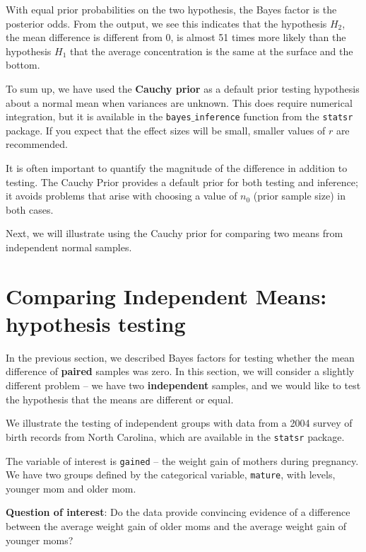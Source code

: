 \documentclass[]{book}
\theoremstyle{definition}
\theoremstyle{definition}
\theoremstyle{definition}
\theoremstyle{remark}
\let\BeginKnitrBlock\begin \let\EndKnitrBlock\end
\begin{document}
With equal prior probabilities on the two hypothesis, the Bayes factor
is the posterior odds. From the output, we see this indicates that the
hypothesis \(H_2\), the mean difference is different from 0, is almost
51 times more likely than the hypothesis \(H_1\) that the average
concentration is the same at the surface and the bottom.

To sum up, we have used the \textbf{Cauchy prior} as a default prior
testing hypothesis about a normal mean when variances are unknown. This
does require numerical integration, but it is available in the
\texttt{bayes$\_$inference} function from the \texttt{statsr} package.
If you expect that the effect sizes will be small, smaller values of
\(r\) are recommended.

It is often important to quantify the magnitude of the difference in
addition to testing. The Cauchy Prior provides a default prior for both
testing and inference; it avoids problems that arise with choosing a
value of \(n_0\) (prior sample size) in both cases.

Next, we will illustrate using the Cauchy prior for comparing two means
from independent normal samples.

\section{Comparing Independent Means: hypothesis
testing}\label{comparing-independent-means-hypothesis-testing}

In the previous section, we described Bayes factors for testing whether
the mean difference of \textbf{paired} samples was zero. In this
section, we will consider a slightly different problem -- we have two
\textbf{independent} samples, and we would like to test the hypothesis
that the means are different or equal.

\BeginKnitrBlock{example}
\protect\hypertarget{exm:birth-records}{}\label{exm:birth-records} We
illustrate the testing of independent groups with data from a 2004
survey of birth records from North Carolina, which are available in the
\texttt{statsr} package.

The variable of interest is \texttt{gained} -- the weight gain of
mothers during pregnancy. We have two groups defined by the categorical
variable, \texttt{mature}, with levels, younger mom and older mom.

\textbf{Question of interest}: Do the data provide convincing evidence
of a difference between the average weight gain of older moms and the
average weight gain of younger moms?
\EndKnitrBlock{example}
\end{document}
